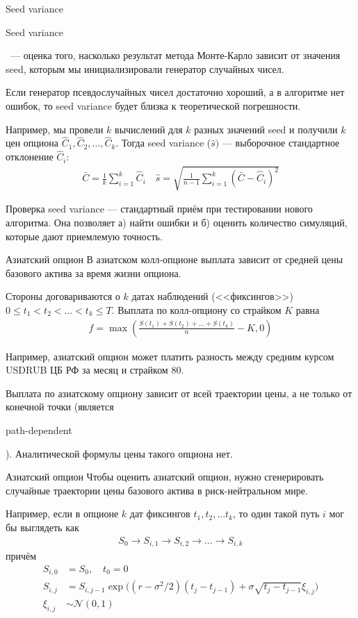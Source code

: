 \documentclass{beamer}
\newcommand{\en}[1]{\begin{otherlanguage}{english}#1\end{otherlanguage}}
\begin{document}
\begin{frame}{Seed variance}
\justify
\en{Seed variance}\ --- оценка того, насколько результат метода Монте-Карло зависит от значения seed, которым мы инициализировали генератор случайных чисел.

\justify
Если генератор псевдослучайных чисел достаточно хороший, а в алгоритме нет ошибок, то seed variance будет близка к теоретической погрешности.

\justify
Например, мы провели $k$ вычислений для $k$ разных значений seed и получили $k$ цен опциона $\hat{C}_1, \hat{C}_2,...,\hat{C}_k$. Тогда seed variance ($\hat{s})$
 --- выборочное стандартное отклонение $\hat{C}_i$:
\begin{align*}
\bar{C} = \frac{1}{k}\sum\limits_{i=1}^{k}\hat{C}_i \quad \hat{s} = \sqrt{\frac{1}{n-1}\sum\limits_{i=1}^{k}(\bar{C} - \hat{C}_i)^2} 
\end{align*}

\justify
Проверка seed variance --- стандартный приём при тестировании нового алгоритма. Она позволяет а) найти ошибки и б) оценить количество симуляций, которые дают приемлемую точность.
\end{frame}



\begin{frame}{Азиатский опцион}
\justify
В азиатском колл-опционе выплата зависит от средней цены базового актива за время жизни опциона.

\justify
Стороны договариваются о $k$ датах наблюдений (<<фиксингов>>) $0 \le t_1 < t_2 < ... < t_k \le T$. Выплата по колл-опциону со страйком $K$ равна
\begin{align*}
f = \max\left(\frac{S(t_1) + S(t_2) + ... + S(t_k)}{n} - K, 0\right)
\end{align*}

\justify
Например, азиатский опцион может платить разность между средним курсом USDRUB ЦБ РФ за месяц и страйком $80$. 

\justify
Выплата по азиатскому опциону зависит от всей траектории цены, а не только от конечной точки (является \en{path-dependent}). Аналитической формулы цены такого опциона нет. 
\end{frame}



\begin{frame}{Азиатский опцион}
\justify
Чтобы оценить азиатский опцион, нужно сгенерировать случайные траектории цены базового актива в риск-нейтральном мире.

\justify
Например, если в опционе $k$ дат фиксингов $t_1, t_2, ... t_k$, то один такой путь $i$ мог бы выглядеть как 
\begin{align*}
S_0 \to S_{i,1} \to S_{i,2} \to ... \to S_{i,k}
\end{align*}
причём
\begin{align*}
S_{i,0} &= S_0, \quad t_0 = 0 \\
S_{i,j} &= S_{i,j-1} \exp\Big((r - \sigma^2/2)(t_j - t_{j-1}) + \sigma\sqrt{t_j - t_{j-1}}\xi_{i,j}\Big) \\
\xi_{i,j} &\sim \mathcal{N}(0, 1)
\end{align*}
\end{frame}
\end{document}
